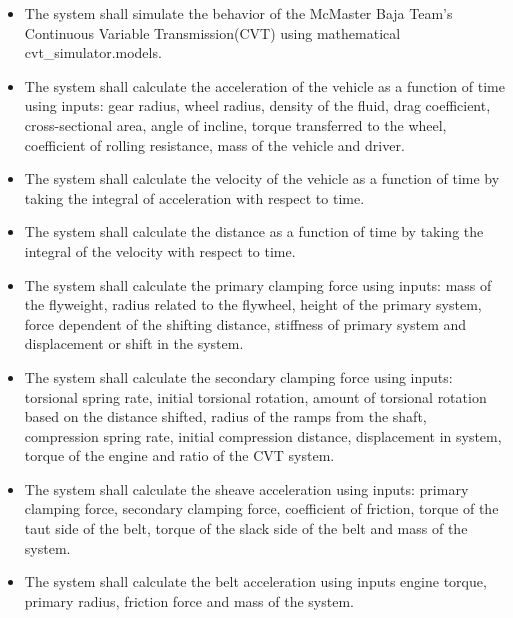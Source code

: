 \documentclass[12pt]{article}
\begin{document}
\noindent \begin{itemize}

\item[R:MM \label{R:MM}:] The system shall simulate the behavior of the McMaster Baja Team's Continuous Variable Transmission(CVT) using mathematical cvt_simulator.models.

\item[R:AV \label{R:AV}:] The system shall calculate the acceleration of the vehicle as a function of time using inputs: gear radius, wheel radius, density of the fluid, drag coefficient, cross-sectional area, angle of incline, torque transferred to the wheel, coefficient of rolling resistance, mass of the vehicle and driver. 

\item[R:VV \label{R:VV}:] The system shall calculate the velocity of the vehicle as a function of time by taking the integral of acceleration with respect to time.

\item[R:DV \label{R:DV}:] The system shall calculate the distance as a function of time by taking the integral of the velocity with respect to time.

\item[R:PCF \label{R:PCF}:] The system shall calculate the primary clamping force using inputs: mass of the flyweight, radius related to the flywheel, height of the primary system, force dependent of the shifting distance, stiffness of primary system and displacement or shift in the system. 

\item[R:SCF \label{R:SCF}:] The system shall calculate the secondary clamping force using inputs: torsional spring rate, initial torsional rotation, amount of torsional rotation based on the distance shifted, radius of the ramps from the shaft, compression spring rate, initial compression distance, displacement in system, torque of the engine and ratio of the CVT system.

\item[R:SA \label{R:SA}:] The system shall calculate the sheave acceleration using inputs: primary clamping force, secondary clamping force, coefficient of friction, torque of the taut side of the belt, torque of the slack side of the belt and mass of the system. 

\item[R:BA \label{R:BA}:] The system shall calculate the belt acceleration using inputs engine torque, primary radius, friction force and mass of the system. 


\end{itemize}
\end{document}
